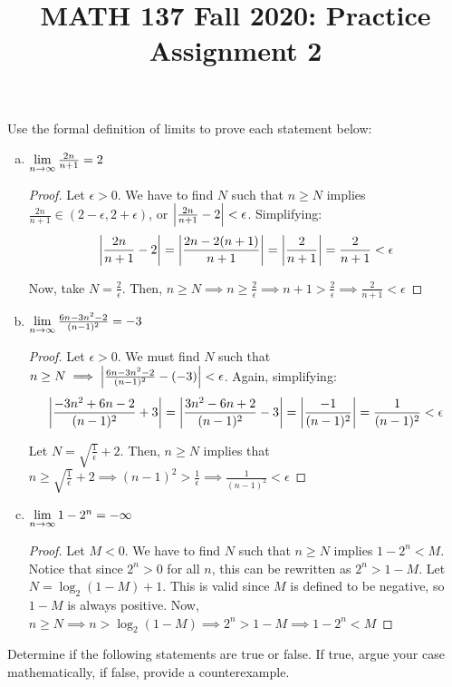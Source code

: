 \documentclass{agony}
\title{MATH 137 Fall 2020: Practice Assignment 2}
\begin{document}
\thispagestyle{firstpage}

\textbf{\thetitle}

\question Use the formal definition of limits to prove each statement below:

\begin{enumerate}[(a)]

  \item $\lim\limits_{n\to\infty}\frac{2n}{n+1}=2$
        \begin{proof}
          Let $\epsilon>0$.
          We have to find $N$ such that $n\geq N$ implies $\frac{2n}{n+1}\in(2-\epsilon,2+\epsilon)$, or $\abs{\frac{2n}{n+1}-2}<\epsilon$.
          Simplifying:
          \[ \abs{\frac{2n}{n+1}-2} = \abs{\frac{2n-2(n+1)}{n+1}} = \abs{\frac{2}{n+1}} = \frac{2}{n+1} < \epsilon \]

          Now, take $N=\frac2\epsilon$.
          Then, $n\geq N\implies n\geq\frac2\epsilon\implies n+1>\frac2\epsilon\implies\frac2{n+1}<\epsilon$
        \end{proof}

  \item $\lim\limits_{n\to\infty}\frac{6n-3n^2-2}{(n-1)^2}=-3$
        \begin{proof}
          Let $\epsilon>0$. We must find $N$ such that $n\geq N\implies \abs{\frac{6n-3n^2-2}{(n-1)^2}-(-3)}<\epsilon$. Again, simplifying:
          \[ \abs{\frac{-3n^2+6n-2}{(n-1)^2}+3} = \abs{\frac{3n^2-6n+2}{(n-1)^2}-3} = \abs{\frac{-1}{(n-1)^2}}= \frac{1}{(n-1)^2} < \epsilon \]

          Let $N=\sqrt{\frac1\epsilon}+2$. Then, $n\geq N$ implies that $n\geq\sqrt{\frac1\epsilon}+2 \implies (n-1)^2>\frac1\epsilon\implies\frac{1}{(n-1)^2}<\epsilon$
        \end{proof}

  \item $\lim\limits_{n\to\infty}1-2^n=-\infty$
        \begin{proof}
          Let $M<0$. We have to find $N$ such that $n\geq N$ implies $1-2^n<M$. Notice that since $2^n>0$ for all $n$, this can be rewritten as $2^n>1-M$. Let $N=\log_2(1-M)+1$. This is valid since $M$ is defined to be negative, so $1-M$ is always positive. Now, $n\geq N\implies n>\log_2(1-M)\implies 2^n>1-M\implies1-2^n<M$
        \end{proof}

\end{enumerate}



\question Determine if the following statements are true or false.
If true, argue your case mathematically, if false, provide a counterexample.
\end{document}
